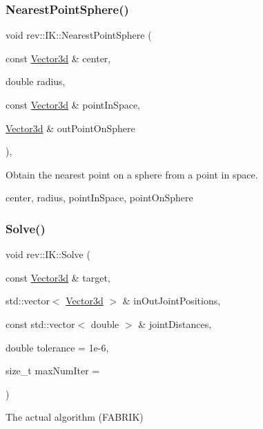\subsubsection{\texorpdfstring{NearestPointSphere()}{NearestPointSphere()}}
{\footnotesize\ttfamily void rev\+::\+I\+K\+::\+Nearest\+Point\+Sphere (\begin{DoxyParamCaption}\item[{const \mbox{\hyperlink{classrev_1_1_vector}{Vector3d}} \&}]{center,  }\item[{double}]{radius,  }\item[{const \mbox{\hyperlink{classrev_1_1_vector}{Vector3d}} \&}]{point\+In\+Space,  }\item[{\mbox{\hyperlink{classrev_1_1_vector}{Vector3d}} \&}]{out\+Point\+On\+Sphere }\end{DoxyParamCaption})\hspace{0.3cm}{\ttfamily [static]}, {\ttfamily [protected]}}



Obtain the nearest point on a sphere from a point in space. 

center, radius, point\+In\+Space, point\+On\+Sphere \mbox{\label{classrev_1_1_i_k_a48bdf55588b6a47ae1ed832977c1905f}} 
\subsubsection{\texorpdfstring{Solve()}{Solve()}}
{\footnotesize\ttfamily void rev\+::\+I\+K\+::\+Solve (\begin{DoxyParamCaption}\item[{const \mbox{\hyperlink{classrev_1_1_vector}{Vector3d}} \&}]{target,  }\item[{std\+::vector$<$ \mbox{\hyperlink{classrev_1_1_vector}{Vector3d}} $>$ \&}]{in\+Out\+Joint\+Positions,  }\item[{const std\+::vector$<$ double $>$ \&}]{joint\+Distances,  }\item[{double}]{tolerance = {\ttfamily 1e-\/6},  }\item[{size\+\_\+t}]{max\+Num\+Iter = {} }\end{DoxyParamCaption})\hspace{0.3cm}{\ttfamily [static]}}



The actual algorithm (F\+A\+B\+R\+IK) 

